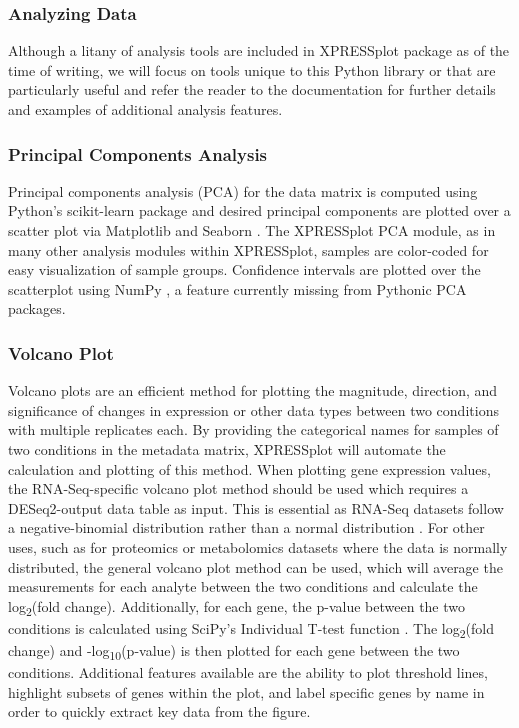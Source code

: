 \documentclass[10pt, oneside]{article}
\begin{document}
\subsubsection{Analyzing Data}

Although a litany of analysis tools are included in XPRESSplot package as of the time of writing, we will focus on tools unique to this Python library or that are particularly useful and refer the reader to the documentation for further details and examples of additional analysis features.

\subsubsection{Principal Components Analysis}
Principal components analysis (PCA) for the data matrix is computed using Python's scikit-learn package \cite{scikit_learn} and desired principal components are plotted over a scatter plot via Matplotlib \cite{matplotlib} and Seaborn \cite{seaborn}. The XPRESSplot PCA module, as in many other analysis modules within XPRESSplot, samples are color-coded for easy visualization of sample groups. Confidence intervals are plotted over the scatterplot using NumPy \cite{numpy1, numpy2}, a feature currently missing from Pythonic PCA packages.

\subsubsection{Volcano Plot}
Volcano plots are an efficient method for plotting the magnitude, direction, and significance of changes in expression or other data types between two conditions with multiple replicates each. By providing the categorical names for samples of two conditions in the metadata matrix, XPRESSplot will automate the calculation and plotting of this method. When plotting gene expression values, the RNA-Seq-specific volcano plot method should be used which requires a DESeq2-output data table as input. This is essential as RNA-Seq datasets follow a negative-binomial distribution rather than a normal distribution \cite{deseq2}. For other uses, such as for proteomics or metabolomics datasets where the data is normally distributed, the general volcano plot method can be used, which will average the measurements for each analyte between the two conditions and calculate the log\textsubscript{2}(fold change). Additionally, for each gene, the p-value between the two conditions is calculated using SciPy's Individual T-test function \cite{scipy}. The log\textsubscript{2}(fold change) and -log\textsubscript{10}(p-value) is then plotted for each gene between the two conditions. Additional features available are the ability to plot threshold lines, highlight subsets of genes within the plot, and label specific genes by name in order to quickly extract key data from the figure.
\end{document}
